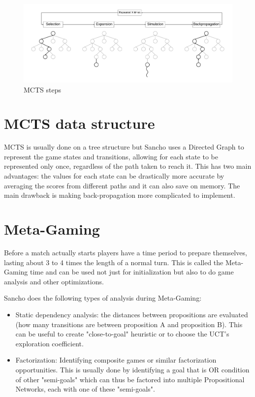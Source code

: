 \begin{figure}[h]
	\centering
	\includegraphics[width=\textwidth]{images/MCTS.pdf}
	\caption{MCTS steps}
	\label{fig:mcts steps}
\end{figure}

\section{MCTS data structure}
MCTS is usually done on a tree structure but Sancho uses a Directed Graph to represent the game states and transitions, allowing for each state to be represented only once, regardless of the path taken to reach it.
This has two main advantages: the values for each state can be drastically more accurate by averaging the scores from different paths and it can also save on memory.
The main drawback is making back-propagation more complicated to implement.


\section{Meta-Gaming}
Before a match actually starts players have a time period to prepare themselves, lasting about 3 to 4 times the length of a normal turn. This is called the Meta-Gaming time and can be used not just for initialization but also to do game analysis and other optimizations.

Sancho does the following types of analysis during Meta-Gaming: 
\begin{itemize}
	\item Static dependency analysis: the distances between propositions are evaluated (how many transitions are between proposition A and proposition B). This can be useful to create "close-to-goal" heuristic or to choose the UCT's exploration coefficient. 
	
	\item Factorization: Identifying composite games or similar factorization opportunities. This is usually done by identifying a goal that is OR condition of other "semi-goals" which can thus be factored into multiple Propositional Networks, each with one of these "semi-goals".	
	
	 
\end{itemize}

